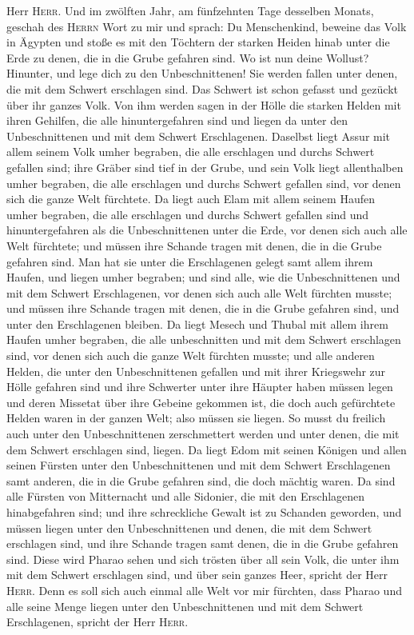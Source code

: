 Herr \textsc{Herr}.  Und im zwölften Jahr, am fünfzehnten
Tage desselben Monats, geschah des \textsc{Herrn} Wort zu mir und
sprach:  Du Menschenkind, beweine das Volk in Ägypten und
stoße es mit den Töchtern der starken Heiden hinab unter die Erde zu
denen, die in die Grube gefahren sind.  Wo ist nun deine
Wollust? Hinunter, und lege dich zu den Unbeschnittenen! 
Sie werden fallen unter denen, die mit dem Schwert erschlagen sind. Das
Schwert ist schon gefasst und gezückt über ihr ganzes Volk.
 Von ihm werden sagen in der Hölle die starken Helden mit
ihren Gehilfen, die alle hinuntergefahren sind und liegen da unter den
Unbeschnittenen und mit dem Schwert Erschlagenen. 
Daselbst liegt Assur mit allem seinem Volk umher begraben, die alle
erschlagen und durchs Schwert gefallen sind;  ihre Gräber
sind tief in der Grube, und sein Volk liegt allenthalben umher begraben,
die alle erschlagen und durchs Schwert gefallen sind, vor denen sich die
ganze Welt fürchtete.  Da liegt auch Elam mit allem
seinem Haufen umher begraben, die alle erschlagen und durchs Schwert
gefallen sind und hinuntergefahren als die Unbeschnittenen unter die
Erde, vor denen sich auch alle Welt fürchtete; und müssen ihre Schande
tragen mit denen, die in die Grube gefahren sind.  Man
hat sie unter die Erschlagenen gelegt samt allem ihrem Haufen, und
liegen umher begraben; und sind alle, wie die Unbeschnittenen und mit
dem Schwert Erschlagenen, vor denen sich auch alle Welt fürchten musste;
und müssen ihre Schande tragen mit denen, die in die Grube gefahren
sind, und unter den Erschlagenen bleiben.  Da liegt
Mesech und Thubal mit allem ihrem Haufen umher begraben, die alle
unbeschnitten und mit dem Schwert erschlagen sind, vor denen sich auch
die ganze Welt fürchten musste;  und alle anderen Helden,
die unter den Unbeschnittenen gefallen und mit ihrer Kriegswehr zur
Hölle gefahren sind und ihre Schwerter unter ihre Häupter haben müssen
legen und deren Missetat über ihre Gebeine gekommen ist, die doch auch
gefürchtete Helden waren in der ganzen Welt; also müssen sie liegen.
 So musst du freilich auch unter den Unbeschnittenen
zerschmettert werden und unter denen, die mit dem Schwert erschlagen
sind, liegen.  Da liegt Edom mit seinen Königen und allen
seinen Fürsten unter den Unbeschnittenen und mit dem Schwert
Erschlagenen samt anderen, die in die Grube gefahren sind, die doch
mächtig waren.  Da sind alle Fürsten von Mitternacht und
alle Sidonier, die mit den Erschlagenen hinabgefahren sind; und ihre
schreckliche Gewalt ist zu Schanden geworden, und müssen liegen unter
den Unbeschnittenen und denen, die mit dem Schwert erschlagen sind, und
ihre Schande tragen samt denen, die in die Grube gefahren sind.
 Diese wird Pharao sehen und sich trösten über all sein
Volk, die unter ihm mit dem Schwert erschlagen sind, und über sein
ganzes Heer, spricht der Herr \textsc{Herr}.  Denn es
soll sich auch einmal alle Welt vor mir fürchten, dass Pharao und alle
seine Menge liegen unter den Unbeschnittenen und mit dem Schwert
Erschlagenen, spricht der Herr \textsc{Herr}.

